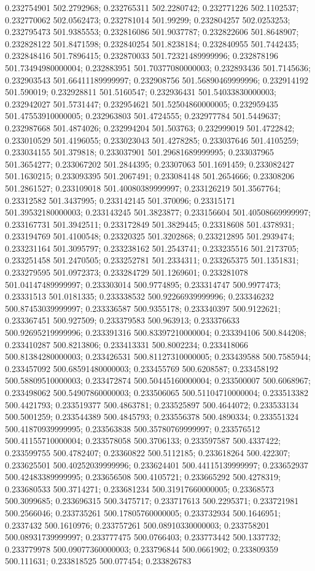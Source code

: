 0.232754901 502.2792968; 0.232765311 502.2280742; 0.232771226 502.1102537; 0.232770062 502.0562473; 0.232781014 501.99299; 0.232804257 502.0253253; 0.232795473 501.9385553; 0.232816086 501.9037787; 0.232822606 501.8648907; 0.232828122 501.8471598; 0.232840254 501.8238184; 0.232840955 501.7442435; 0.232848416 501.7896415; 0.232870033 501.72321489999996; 0.232878196 501.73494980000004; 0.232883951 501.70377080000003; 0.232893436 501.7145636; 0.232903543 501.66411189999997; 0.232908756 501.56890469999996; 0.232914192 501.590019; 0.232928811 501.5160547; 0.232936431 501.54033830000003; 0.232942027 501.5731447; 0.232954621 501.52504860000005; 0.232959435 501.47553910000005; 0.232963803 501.4724555; 0.232977784 501.5449637; 0.232987668 501.4874026; 0.232994204 501.503763; 0.232999019 501.4722842; 0.233010529 501.4196055; 0.233023043 501.4278285; 0.233037646 501.4105259; 0.233034155 501.379818; 0.233037901 501.29681689999995; 0.233037965 501.3654277; 0.233067202 501.2844395; 0.23307063 501.1691459; 0.233082427 501.1630215; 0.233093395 501.2067491; 0.233084148 501.2654666; 0.23308206 501.2861527; 0.233109018 501.40080389999997; 0.233126219 501.3567764; 0.23312582 501.3437995; 0.233142145 501.370096; 0.23315171 501.39532180000003; 0.233143245 501.3823877; 0.233156604 501.40508669999997; 0.233167731 501.3942511; 0.233172849 501.3829445; 0.23318608 501.4378931; 0.233194769 501.4100548; 0.23320325 501.3202868; 0.233212895 501.2939474; 0.233231164 501.3095797; 0.233238162 501.2543741; 0.233235516 501.2173705; 0.233251458 501.2470505; 0.233252781 501.2334311; 0.233265375 501.1351831; 0.233279595 501.0972373; 0.233284729 501.1269601; 0.233281078 501.04147489999997; 0.233303014 500.9774895; 0.233314747 500.9977473; 0.23331513 501.0181335; 0.233338532 500.92266939999996; 0.233346232 500.87453039999997; 0.233336587 500.9355178; 0.233340397 500.9122621; 0.233367451 500.927509; 0.233379583 500.963913; 0.233376633 500.92695219999996; 0.233391316 500.83397210000004; 0.233394106 500.844208; 0.233410287 500.8213806; 0.233413331 500.8002234; 0.233418066 500.81384280000003; 0.233426531 500.81127310000005; 0.233439588 500.7585944; 0.233457092 500.68591480000003; 0.233455769 500.6208587; 0.233458192 500.58809510000003; 0.233472874 500.50445160000004; 0.233500007 500.6068967; 0.233498062 500.54907860000003; 0.233506065 500.51104710000004; 0.233513382 500.4421793; 0.233519377 500.4863781; 0.233525897 500.4644072; 0.233533134 500.5001259; 0.233544389 500.4845793; 0.233556378 500.4890334; 0.233551324 500.41870939999995; 0.233563838 500.35780769999997; 0.233576512 500.41155710000004; 0.233578058 500.3706133; 0.233597587 500.4337422; 0.233599755 500.4782407; 0.23360822 500.5112185; 0.233618264 500.422307; 0.233625501 500.40252039999996; 0.233624401 500.44115139999997; 0.233652937 500.42483389999995; 0.233656508 500.4105721; 0.233665292 500.4278319; 0.233680533 500.3714271; 0.233681234 500.31917660000005; 0.23368573 500.3099685; 0.233696315 500.3475717; 0.233717613 500.2295371; 0.233721981 500.2566046; 0.233735261 500.17805760000005; 0.233732934 500.1646951; 0.2337432 500.1610976; 0.233757261 500.08910330000003; 0.233758201 500.08931739999997; 0.233777475 500.0766403; 0.233773442 500.1337732; 0.233779978 500.09077360000003; 0.233796844 500.0661902; 0.233809359 500.111631; 0.233818525 500.077454; 0.233826783 